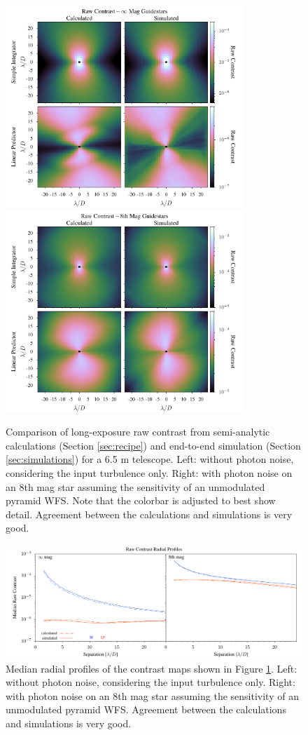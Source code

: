 \documentclass[10pt,preprint]{aastex631}
\begin{document}
\begin{figure}
\hspace{-0.3in}
\includegraphics[width=3.54in]{contrast0mag.pdf}
\includegraphics[width=3.54in]{contrast8mag.pdf}
\caption{Comparison of long-exposure raw contrast from semi-analytic calculations (Section \ref{sec:recipe}) and end-to-end simulation (Section \ref{sec:simulations}) for a 6.5 m telescope. Left: without photon noise, considering the input turbulence only.  Right: with photon noise on an 8th mag star assuming the sensitivity of an unmodulated pyramid WFS. Note that the colorbar is adjusted to best show detail.  Agreement between the calculations and simulations is very good.\label{fig:contrast_2Dcomp}}
\end{figure}

\begin{figure}
\hspace{-0.3in}
\includegraphics[width=6.5in]{contrastRP.pdf}
\caption{Median radial profiles of the contrast maps shown in Figure \ref{fig:contrast_2Dcomp}.  Left: without photon noise, considering the input turbulence only.  Right: with photon noise on an 8th mag star assuming the sensitivity of an unmodulated pyramid WFS. Agreement between the calculations and simulations is very good.\label{fig:contrast_radprof}}
\end{figure}
\end{document}
